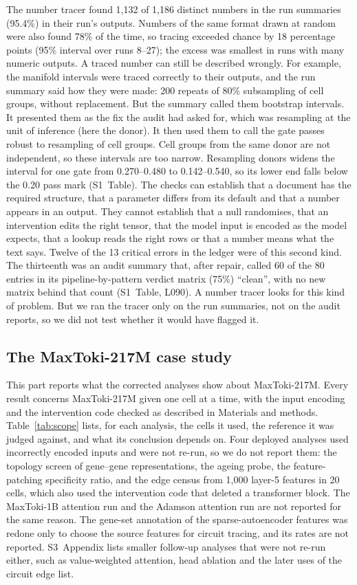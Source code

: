 \documentclass[10pt,letterpaper]{article}
\begin{document}
The number tracer found 1,132 of 1,186 distinct numbers in the run
summaries (95.4\%) in their run's outputs. Numbers of the same format
drawn at random were also found 78\% of the time, so tracing exceeded
chance by 18 percentage points (95\% interval over runs 8--27); the
excess was smallest in runs with many numeric outputs. A traced number
can still be described wrongly. For example, the manifold intervals were
traced correctly to their outputs, and the run summary said how they were
made: 200 repeats of 80\% subsampling of cell groups, without
replacement. But the summary called them bootstrap intervals. It presented them as the
fix the audit had asked for, which was resampling at the unit of inference
(here the donor). It then used them to call the gate passes robust to
resampling of cell groups. Cell groups
from the same donor are not independent, so these intervals are too
narrow. Resampling donors widens the interval for one gate from
0.270--0.480 to 0.142--0.540, so its lower end falls below the 0.20 pass
mark (S1~Table). The checks
can establish that a document has the required structure, that a
parameter differs from its default and that a number appears in an
output. They cannot establish that a null randomises, that an
intervention edits the right tensor, that the model input is encoded as
the model expects, that a lookup reads the right rows or that a number
means what the text says. Twelve of the 13 critical errors in the ledger
were of this second kind. The thirteenth was an audit summary that,
after repair, called 60 of the 80 entries in its pipeline-by-pattern
verdict matrix (75\%) ``clean'', with no new matrix behind that count
(S1~Table, L090). A number tracer looks for this kind of problem. But we
ran the tracer only on the run summaries, not on the audit reports, so we
did not test whether it would have flagged it.

\subsection*{The MaxToki-217M case study}
This part reports what the corrected analyses show about MaxToki-217M.
Every result concerns MaxToki-217M given one cell at a time, with the
input encoding and the intervention code checked as described in
Materials and methods. Table~\ref{tab:scope} lists, for each analysis,
the cells it used, the reference it was judged against, and what its
conclusion depends on. Four deployed analyses used incorrectly encoded
inputs and were not re-run, so we do not report them: the topology
screen of gene--gene representations, the ageing probe, the
feature-patching specificity ratio, and the edge census from 1,000
layer-5 features in 20 cells, which also used the intervention code that
deleted a transformer block. The MaxToki-1B attention run and the
Adamson attention run are not reported for the same reason. The
gene-set annotation of the sparse-autoencoder features was redone only
to choose the source features for circuit tracing, and its rates are not
reported. S3~Appendix lists smaller follow-up analyses that were not
re-run either, such as value-weighted attention, head ablation and the
later uses of the circuit edge list.
\end{document}

